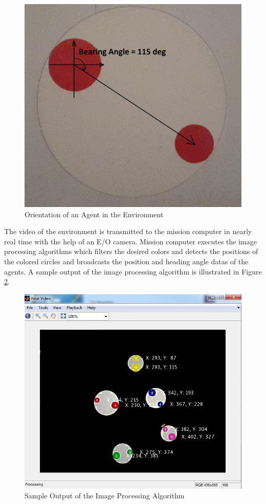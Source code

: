 \begin{figure}[H]
\caption{Orientation of an Agent in the Environment} \label{bearing_ref}
\centerline{\includegraphics[scale = 0.20]{Bearing_Angle}}
\end{figure} 


The video of the environment is transmitted to the mission computer in nearly real time with the help of an E/O camera. Mission computer executes the image processing algorithms which filters the desired colors and detects the positions of the colored circles and broadcasts the position and heading angle datas of the agents. A sample output of the image processing algorithm is illustrated in Figure \ref{imageprocess_ref}. 
		
\begin{figure}[H]
\caption{Sample Output of the Image Processing Algorithm} \label{imageprocess_ref}
\centerline{\includegraphics[scale = 0.50]{Image_Processing}}
\end{figure} 
		

